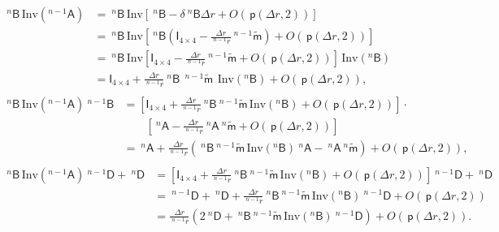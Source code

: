 \documentclass[preprint,10pt,times]{elsarticle}
\numberwithin{equation}{section}
\renewcommand{\u}[1]{\boldsymbol{#1}}
\newcommand{\usf}[1]{\u{\mathsf #1}}
\newcommand{\pr}[1]{\left( #1 \right)}
\newcommand{\p}{\,\mathsf{p}}
\newcommand{\Inv}{\,\mathrm{Inv}}
\renewcommand{\>}{$\Rightarrow$}
\begin{document}
\begin{subequations}
	\begin{align}
	\begin{split}
		~^{n}{\usf{B}} \Inv\pr{{}^{{n-1}}\usf{A}}
		& = ~^{n}{\usf{B}} \Inv\left[ ~^{n}\usf{B} - \delta ~^{n}\usf{B} \Delta r + O(\p\pr{\Delta r,2}) \right] \\
		& = ~^{n}{\usf{B}} \Inv\left[ ~^{n}\usf{B} \left( \usf{I}_{4\times 4}- \frac{\Delta r}{~^{n-1}\!{r}} ~^{n-1}\tilde{\usf{m}} \right) + O(\p\pr{\Delta r,2}) \right] \\
		& = ~^{n}{\usf{B}} \Inv\left[ \usf{I}_{4\times 4} - \frac{\Delta r}{~^{n-1}\!{r}} ~^{n-1}\tilde{\usf{m}} + O(\p\pr{\Delta r,2}) \right] \Inv\pr{{}^{{n}}\usf{B}} \\
		& = \usf{I}_{4\times 4} + \frac{\Delta r}{~^{n-1}\!{r}} ~^{n}{\usf{B}}\  ~^{n-1}\tilde{\usf{m}}\  \Inv\pr{{}^{n}\usf{B}} + O(\p\pr{\Delta r,2}),
	\end{split}\\
	\begin{split}
		~^{n}{\usf{B}} \Inv\pr{{}^{{n-1}}\usf{A}} ~^{{n-1}}{\usf{B}}
		& = \left[ \usf{I}_{4\times 4} + \frac{\Delta r}{~^{n-1}\!{r}} ~^{n}{\usf{B}} ~^{n-1}\tilde{\usf{m}} \Inv\pr{{}^{n}\usf{B}} + O(\p\pr{\Delta r,2}) \right] \cdot \\
		& \qquad \left[ ~^{n}\usf{A} - \frac{\Delta r}{~^{n-1}\!{r}} ~^{n}{\usf{A}} ~^{n}\tilde{\usf{m}} + O(\p\pr{\Delta r,2}) \right] \\
		& = ~^{n}\usf{A} + \frac{\Delta r}{~^{n-1}\!{r}} \left( ~^{n}{\usf{B}} ~^{n-1}\tilde{\usf{m}} \Inv\pr{{}^{n}\usf{B}} ~^{n}\usf{A} - ~^{n}{\usf{A}} ~^{n}\tilde{\usf{m}} \right) + O(\p\pr{\Delta r,2}),
	\end{split} \\
	\begin{split}
		~^{n}{\usf{B}} \Inv\pr{{}^{{n-1}}\usf{A}} ~^{{n-1}}{\usf{D}} + ~^{n}{\usf{D}}
		& = \left[ \usf{I}_{4\times 4} + \frac{\Delta r}{~^{n-1}\!{r}} ~^{n}{\usf{B}} ~^{n-1}\tilde{\usf{m}} \Inv\pr{{}^{n}\usf{B}} + O(\p\pr{\Delta r,2}) \right] ~^{{n-1}}{\usf{D}} + ~^{n}{\usf{D}} \\
		& = ~^{{n-1}}{\usf{D}} + ~^{n}{\usf{D}} + \frac{\Delta r}{~^{n-1}\!{r}} ~^{n}{\usf{B}} ~^{n-1}\tilde{\usf{m}} \Inv\pr{{}^{n}\usf{B}} ~^{{n-1}}{\usf{D}} + O(\p\pr{\Delta r,2}) \\
		& = \frac{\Delta r}{~^{n-1}\!{r}} \left( 2~^{n}{\usf{D}} + ~^{n}{\usf{B}} ~^{n-1}\tilde{\usf{m}} \Inv\pr{{}^{n}\usf{B}} ~^{{n-1}}{\usf{D}} \right) + O(\p\pr{\Delta r,2}).
	\end{split}
	\end{align}
	\label{eq:C5}
\end{subequations}
\end{document}
